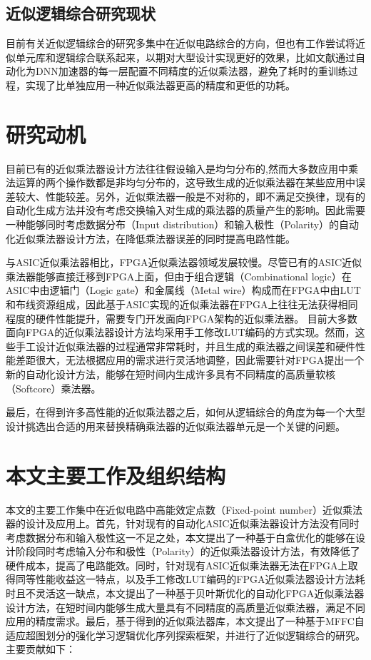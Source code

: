 
\subsection{近似逻辑综合研究现状}

目前有关近似逻辑综合的研究多集中在近似电路综合的方向\cite{AC:ALS:ALSRAC}，但也有工作尝试将近似单元库和逻辑综合联系起来，以期对大型设计实现更好的效果，比如文献\cite{Accelerator:ALWANN}通过自动化为DNN加速器的每一层配置不同精度的近似乘法器，避免了耗时的重训练过程，实现了比单独应用一种近似乘法器更高的精度和更低的功耗。



\section{研究动机}


目前已有的近似乘法器设计方法往往假设输入是均匀分布的,然而大多数应用中乘法运算的两个操作数都是非均匀分布的，这导致生成的近似乘法器在某些应用中误差较大、性能较差。另外，近似乘法器一般是不对称的，即不满足交换律，现有的自动化生成方法并没有考虑交换输入对生成的乘法器的质量产生的影响。因此需要一种能够同时考虑数据分布（Input distribution）和输入极性（Polarity）的自动化近似乘法器设计方法，在降低乘法器误差的同时提高电路性能。

与ASIC近似乘法器相比，FPGA近似乘法器领域发展较慢。尽管已有的ASIC近似乘法器能够直接迁移到FPGA上面，但由于组合逻辑（Combinational logic）在ASIC中由逻辑门（Logic gate）和金属线（Metal wire）构成而在FPGA中由LUT和布线资源组成，因此基于ASIC实现的近似乘法器在FPGA上往往无法获得相同程度的硬件性能提升，需要专门开发面向FPGA架构的近似乘法器。
目前大多数面向FPGA的近似乘法器设计方法均采用手工修改LUT编码的方式实现。然而，这些手工设计近似乘法器的过程通常非常耗时，并且生成的乘法器之间误差和硬件性能差距很大，无法根据应用的需求进行灵活地调整，因此需要针对FPGA提出一个新的自动化设计方法，能够在短时间内生成许多具有不同精度的高质量软核（Softcore）乘法器。

最后，在得到许多高性能的近似乘法器之后，如何从逻辑综合的角度为每一个大型设计挑选出合适的用来替换精确乘法器的近似乘法器单元是一个关键的问题。


\section{本文主要工作及组织结构}

本文的主要工作集中在近似电路中高能效定点数（Fixed-point number）近似乘法器的设计及应用上。首先，针对现有的自动化ASIC近似乘法器设计方法没有同时考虑数据分布和输入极性这一不足之处，本文提出了一种基于白盒优化的能够在设计阶段同时考虑输入分布和极性（Polarity）的近似乘法器设计方法，有效降低了硬件成本，提高了电路能效。同时，针对现有ASIC近似乘法器无法在FPGA上取得同等性能收益这一特点，以及手工修改LUT编码的FPGA近似乘法器设计方法耗时且不灵活这一缺点，本文提出了一种基于贝叶斯优化的自动化FPGA近似乘法器设计方法，在短时间内能够生成大量具有不同精度的高质量近似乘法器，满足不同应用的精度需求。最后，基于得到的近似乘法器库，本文提出了一种基于MFFC自适应超图划分的强化学习逻辑优化序列探索框架，并进行了近似逻辑综合的研究。主要贡献如下：


